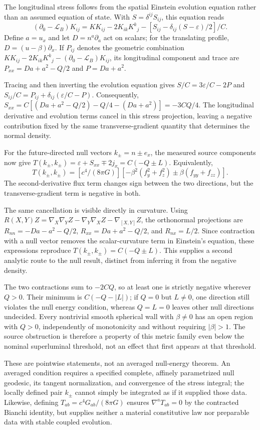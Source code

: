 \documentclass[11pt]{article}
\begin{document}
The longitudinal stress follows from the spatial Einstein evolution equation rather than an assumed equation of state. With $S=\delta^{ij}S_{ij}$, this equation reads \[(\partial_0-\mathcal L_B)K_{ij}=KK_{ij}-2K_{ik}K^k{}_j-[S_{ij}-\delta_{ij}(S-\varepsilon)/2]/C.\] Define $a=u_x$ and let $D=n^a\partial_a$ act on scalars; for the translating profile, $D=(u-\beta)\partial_x$. If $P_{ij}$ denotes the geometric combination $KK_{ij}-2K_{ik}K^k{}_j-(\partial_0-\mathcal L_B)K_{ij}$, its longitudinal component and trace are $P_{xx}=Da+a^2-Q/2$ and $P=Da+a^2$.

Tracing and then inverting the evolution equation gives $S/C=3\varepsilon/C-2P$ and $S_{ij}/C=P_{ij}+\delta_{ij}(\varepsilon/C-P)$. Consequently, $S_{xx}=C[(Da+a^2-Q/2)-Q/4-(Da+a^2)]=-3CQ/4$. The longitudinal derivative and evolution terms cancel in this stress projection, leaving a negative contribution fixed by the same transverse-gradient quantity that determines the normal density.

For the future-directed null vectors $k_\pm=n\pm e_x$, the measured source components now give $T(k_\pm,k_\pm)=\varepsilon+S_{xx}\mp2j_x=C(-Q\pm L)$. Equivalently, \[T(k_\pm,k_\pm)=[c^4/(8\pi G)][-\beta^2(f_y^2+f_z^2)\pm\beta(f_{yy}+f_{zz})].\] The second-derivative flux term changes sign between the two directions, but the transverse-gradient term is negative in both.

The same cancellation is visible directly in curvature. Using $R(X,Y)Z=\nabla_X\nabla_YZ-\nabla_Y\nabla_XZ-\nabla_{[X,Y]}Z$, the orthonormal projections are $R_{nn}=-Da-a^2-Q/2$, $R_{xx}=Da+a^2-Q/2$, and $R_{nx}=L/2$. Since contraction with a null vector removes the scalar-curvature term in Einstein\textquoteright{}s equation, these expressions reproduce $T(k_\pm,k_\pm)=C(-Q\pm L)$. This supplies a second analytic route to the null result, distinct from inferring it from the negative density.

The two contractions sum to $-2CQ$, so at least one is strictly negative wherever $Q>0$. Their minimum is $C(-Q-|L|)$; if $Q=0$ but $L\neq0$, one direction still violates the null energy condition, whereas $Q=L=0$ leaves other null directions undecided. Every nontrivial smooth spherical wall with $\beta\neq0$ has an open region with $Q>0$, independently of monotonicity and without requiring $|\beta|>1$. The source obstruction is therefore a property of this metric family even below the nominal superluminal threshold, not an effect that first appears at that threshold.

These are pointwise statements, not an averaged null-energy theorem. An averaged condition requires a specified complete, affinely parametrized null geodesic, its tangent normalization, and convergence of the stress integral; the locally defined pair $k_\pm$ cannot simply be integrated as if it supplied those data. Likewise, defining $T_{ab}=c^4G_{ab}/(8\pi G)$ ensures $\nabla^aT_{ab}=0$ by the contracted Bianchi identity, but supplies neither a material constitutive law nor preparable data with stable coupled evolution.
\end{document}
